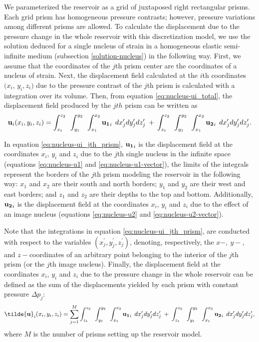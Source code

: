 \documentclass[journal abbreviation, manuscript]{copernicus}
\begin{document}
We parameterized the reservoir as a grid of juxtaposed right rectangular prisms.
Each grid prism has homogeneous pressure contrasts; however, pressure variations among different prisms are allowed. 
To calculate the displacement due to the pressure change in the whole reservoir with this discretization model, we use the solution deduced for a single nucleus of strain in a homogeneous elastic semi-infinite medium (subsection \ref{solution-nucleus}) in the following way. 
First, we assume that the coordinates of the $j$th prism center are the coordinates of a nucleus of strain.
Next, the displacement field calculated at the $i$th coordinates  $(x_i$, $y_i, z_i)$  due to the pressure contrast of the $j$th prism is calculated with a integration over its volume.
Then, from equation \ref{eq:nucleus-ui_total}, the displacement field produced by the $jth$ prism can be written as 
\begin{equation}
{\bf{u}}_{i} (x_i,y_i,z_i) =  
\int_{z_1}^{z_2} \:\:
\int_{y_1}^{y_2} \:\: 
\int_{x_1}^{x_2} 
{\bf{u_{1}}}_{i} \: \:  dx^{\prime}_j dy^{\prime}_j dz^{\prime}_j 
\: + \:
\int_{z_1}^{z_2} \:\:
\int_{y_1}^{y_2} \:\: 
\int_{x_1}^{x_2} 
{\bf{u_{2}}}_{i} \:\:  dx^{\prime}_j dy^{\prime}_j dz^{\prime}_j.
\label{eq:nucleus-ui_jth_prism}
\end{equation}

In equation \ref{eq:nucleus-ui_jth_prism},  ${\bf{u_{1}}}_{i}$ is the displacement field at the coordinates $x_i$, $y_i$  and $z_i$  due to the $j$th single nucleus in the infinite space (equations \ref{eq:nucleus-u1} and  \ref{eq:nucleus-u1-vector}), the limits of the integrals represent the borders of the $j$th prism modeling the reservoir in the following way: $x_1$ and $x_2$ are their south and north borders; $y_1$ and  $y_2$ are their  west and east borders;  and $z_1$ and $z_2$ are their depths to the top and bottom.
Additionally, ${\bf{u_{2}}}_{i}$ is the displacement field at the coordinates $x_i$, $y_i$  and $z_i$  due to the effect of an image nucleus (equations \ref{eq:nucleus-u2} and  \ref{eq:nucleus-u2-vector}). 
 
Note that the integrations in equation \ref{eq:nucleus-ui_jth_prism}, are conducted with respect to the variables $(x^{\prime}_{j}, y^{\prime}_{j}, z^{\prime}_{j})$, denoting, respectively, the
$x-, \: y-$, and $z-$coordinates of an arbitrary point belonging to the interior
of the $j$th prism (or the $j$th image nucleus).
Finally, the displacement field at the coordinates $x_i$, $y_i$  and $z_i$ due to the pressure change in the whole reservoir can be defined as the sum of the displacements yielded by each prism with constant pressure $\Delta p_{j}$:
\begin{equation}
{\bf{\tilde{u}}}_{i} (x_i,y_i,z_i) = \sum_{j=1}^{M} 
\int_{z_1}^{z_2} \:\:
\int_{y_1}^{y_2} \:\: 
\int_{x_1}^{x_2} 
{\bf{u_{1}}}_{i} \: \:  dx^{\prime}_j dy^{\prime}_j dz^{\prime}_j 
\: + \: 
\int_{z_1}^{z_2} \:\:
\int_{y_1}^{y_2} \:\: 
\int_{x_1}^{x_2} 
{\bf{u_{2}}}_{i} \:\:  dx^{\prime}_j dy^{\prime}_j dz^{\prime}_j, 
\label{eq:nucleus-ui_M_prisms}
\end{equation}
where $M$ is the number of prisms setting up the reservoir model.
\end{document}
